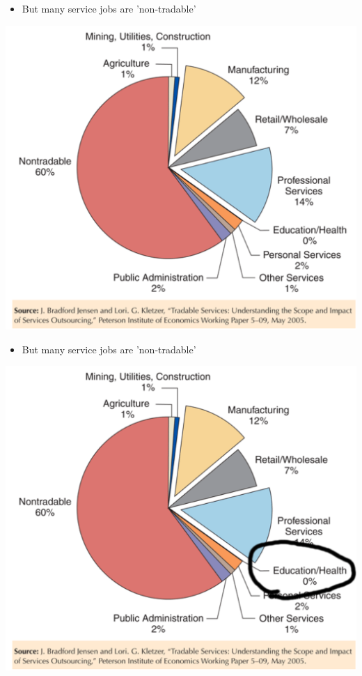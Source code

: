 \documentclass[ignorenonframetext,]{beamer}
\begin{document}
\begin{frame}

   \begin{itemize}
        \item But many service jobs are 'non-tradable'
    \end{itemize}

    \includegraphics[scale=0.20]{tradable_services.png}

\end{frame}

\begin{frame}

   \begin{itemize}
        \item But many service jobs are 'non-tradable'
    \end{itemize}

    \includegraphics[scale=0.20]{tradable_services_yikes.png}

\end{frame}
\end{document}
